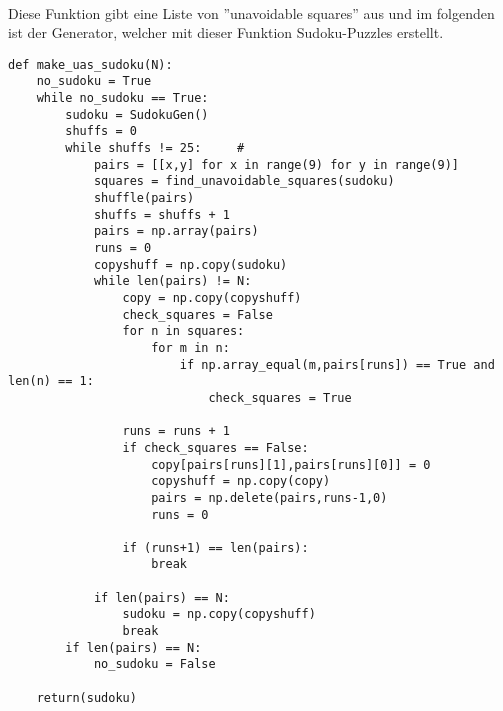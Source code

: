 \documentclass[11pt,a4paper]{article}
\begin{document}
\ \\
Diese Funktion gibt eine Liste von ''unavoidable squares'' aus und im folgenden ist der Generator, welcher mit dieser Funktion Sudoku-Puzzles erstellt.
\ \\
\begin{verbatim}   
def make_uas_sudoku(N):
    no_sudoku = True            
    while no_sudoku == True:    
        sudoku = SudokuGen()    
        shuffs = 0              
        while shuffs != 25:     #
            pairs = [[x,y] for x in range(9) for y in range(9)]  
            squares = find_unavoidable_squares(sudoku)           
            shuffle(pairs)                                       
            shuffs = shuffs + 1                                  
            pairs = np.array(pairs)                              
            runs = 0                                             
            copyshuff = np.copy(sudoku)                           
            while len(pairs) != N:                               
                copy = np.copy(copyshuff)                        
                check_squares = False                            
                for n in squares:                                
                    for m in n:                                                    
                        if np.array_equal(m,pairs[runs]) == True and len(n) == 1:  
                            check_squares = True                                   
                
                runs = runs + 1                       
                if check_squares == False:                       
                    copy[pairs[runs][1],pairs[runs][0]] = 0      
                    copyshuff = np.copy(copy)                   
                    pairs = np.delete(pairs,runs-1,0) 
                    runs = 0
                    
                if (runs+1) == len(pairs):                                
                    break                                                 
                                                                          
            if len(pairs) == N:                      
                sudoku = np.copy(copyshuff)          
                break                                
        if len(pairs) == N:                
            no_sudoku = False              
   
    return(sudoku)    
\end{verbatim}
\ \\
\end{document}
